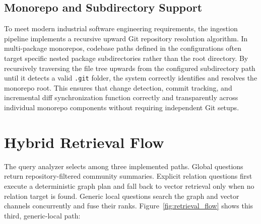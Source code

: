 \documentclass[12pt,letterpaper,oneside]{report}
\begin{document}
\subsection{Monorepo and Subdirectory Support}
To meet modern industrial software engineering requirements, the ingestion pipeline implements a recursive upward Git repository resolution algorithm. In multi-package monorepos, codebase paths defined in the configurations often target specific nested package subdirectories rather than the root directory. By recursively traversing the file tree upwards from the configured subdirectory path until it detects a valid \texttt{.git} folder, the system correctly identifies and resolves the monorepo root. This ensures that change detection, commit tracking, and incremental diff synchronization function correctly and transparently across individual monorepo components without requiring independent Git setups.

\section{Hybrid Retrieval Flow}
The query analyzer selects among three implemented paths. Global questions return repository-filtered community summaries. Explicit relation questions first execute a deterministic graph plan and fall back to vector retrieval only when no relation target is found. Generic local questions search the graph and vector channels concurrently and fuse their ranks. Figure~\ref{fig:retrieval_flow} shows this third, generic-local path:
\end{document}
